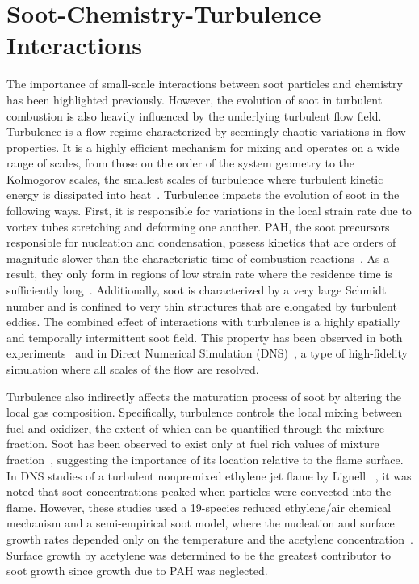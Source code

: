 \section{Soot-Chemistry-Turbulence Interactions}
\label{sec:intro:scti}

The importance of small-scale interactions between soot particles and chemistry has been highlighted previously. However, the evolution of soot in turbulent combustion is also heavily influenced by the underlying turbulent flow field. Turbulence is a flow regime characterized by seemingly chaotic variations in flow properties. It is a highly efficient mechanism for mixing and operates on a wide range of scales, from those on the order of the system geometry to the Kolmogorov scales, the smallest scales of turbulence where turbulent kinetic energy is dissipated into heat~\cite{pope2000}. Turbulence impacts the evolution of soot in the following ways. First, it is responsible for variations in the local strain rate due to vortex tubes stretching and deforming one another. PAH, the soot precursors responsible for nucleation and condensation, possess kinetics that are orders of magnitude slower than the characteristic time of combustion reactions~\cite{cuoci2009}. As a result, they only form in regions of low strain rate where the residence time is sufficiently long~\cite{bisetti2012,attili2014,attili2015}. Additionally, soot is characterized by a very large Schmidt number and is confined to very thin structures that are elongated by turbulent eddies. The combined effect of interactions with turbulence is a highly spatially and temporally intermittent soot field. This property has been observed in both experiments~\cite{lee2009,qamar2009,narayanaswamy2013,mahmoud2015} and in Direct Numerical Simulation (DNS)~\cite{lignell2007,lignell2008,bisetti2012,attili2014,attili2015}, a type of high-fidelity simulation where all scales of the flow are resolved.

Turbulence also indirectly affects the maturation process of soot by altering the local gas composition. Specifically, turbulence controls the local mixing between fuel and oxidizer, the extent of which can be quantified through the mixture fraction. Soot has been observed to exist only at fuel rich values of mixture fraction~\cite{bisetti2012,attili2014,mahmoud2015,park2017}, suggesting the importance of its location relative to the flame surface. In DNS studies of a turbulent nonpremixed ethylene jet flame by Lignell \etal~\cite{lignell2007,lignell2008}, it was noted that soot concentrations peaked when particles were convected into the flame. However, these studies used a 19-species reduced ethylene/air chemical mechanism and a semi-empirical soot model, where the nucleation and surface growth rates depended only on the temperature and the acetylene concentration~\cite{leung1991}. Surface growth by acetylene was determined to be the greatest contributor to soot growth since growth due to PAH was neglected.

